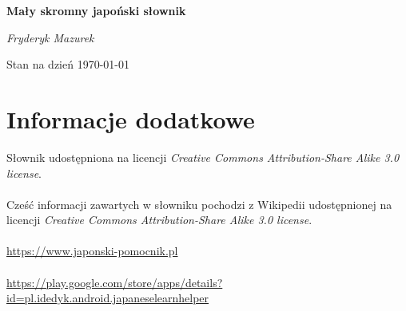 \documentclass[10pt,a4paper,twoside,titlepage]{report} %
\begin{document}
\begin{titlepage}
	\centering
	\vspace*{6.5cm}
	{\huge\bfseries Mały skromny japoński słownik\par}
	\vspace{2cm}
	{\Large\itshape Fryderyk Mazurek\par}
	
	\vfill

	{\large Stan na dzień \today\par}
\end{titlepage}



\newpage
\section*{Informacje dodatkowe}
\markboth{}{}

\noindent Słownik udostępniona na licencji \textit{Creative Commons Attribution-Share Alike 3.0 license}. \\ \\
\noindent Cześć informacji zawartych w słowniku pochodzi z Wikipedii udostępnionej na licencji \textit{Creative Commons Attribution-Share Alike 3.0 license}. \\ \\
\noindent \url{https://www.japonski-pomocnik.pl} \\ \\
\noindent \url{https://play.google.com/store/apps/details?id=pl.idedyk.android.japaneselearnhelper}

\end{document}
